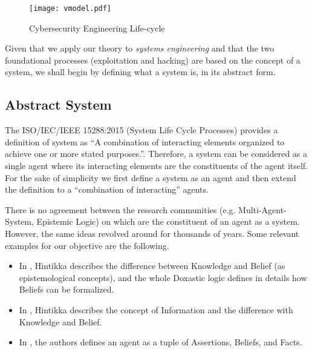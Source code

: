 \begin{figure}[t]
	\centering
	\texttt{[image: vmodel.pdf]}
	\caption{Cybersecurity Engineering Life-cycle}
	\label{fig:simplifiedvmodel}
\end{figure}

Given that we apply our theory to \emph{systems engineering} and that
the two foundational processes (exploitation and hacking) are based on the
concept of a system, we shall begin by defining what a system is, in its
abstract form.

\subsection{Abstract System}\label{sec:systemstate}
The ISO/IEC/IEEE 15288:2015 (System Life Cycle Processes) provides a definition
of system as ``A combination of interacting elements organized to achieve one
or more stated purposes.''\autocite{ISO201515288}.  Therefore, a system can be
considered as a single agent where its interacting elements are the
constituents of the agent itself. For the sake of simplicity we first define a
system as an agent and then extend the definition to a ``combination of
interacting'' agents.  

There is no agreement between the research communities (e.g.
Multi-Agent-System, Epistemic Logic) on which are the constituent of an agent
as a system. However, the same ideas revolved around for thousands of years.
Some relevant examples for our objective are the following.
\begin{itemize}
	\item In \autocite{Hintikka1962knowledge}, Hintikka describes the
		difference between Knowledge and Belief (as epistemological
		concepts), and the whole Doxastic logic defines in details how
		Beliefs can be formalized.
	\item In \autocite{Hintikka1993Information}, Hintikka describes the concept
		of Information and the difference with Knowledge and Belief.
	\item In \autocite{Santaca2016abf}, the authors defines an agent as a
		tuple of Assertions, Beliefs, and Facts.
\end{itemize}

